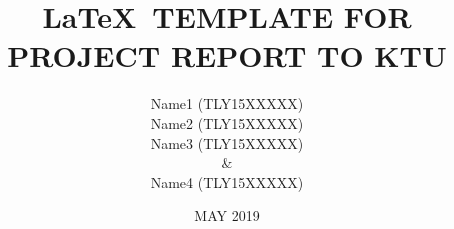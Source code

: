 \documentclass[BTech]{cetlyproj}
\begin{document}
\title{\LaTeX\ TEMPLATE FOR PROJECT REPORT TO KTU}
\author{Name1 (TLY15XXXXX)\\Name2 (TLY15XXXXX)\\Name3 (TLY15XXXXX)\\ \& \\Name4 (TLY15XXXXX)}



\date{MAY 2019}

\maketitle

\declaration

\vspace*{0.25in}
\end{document}

